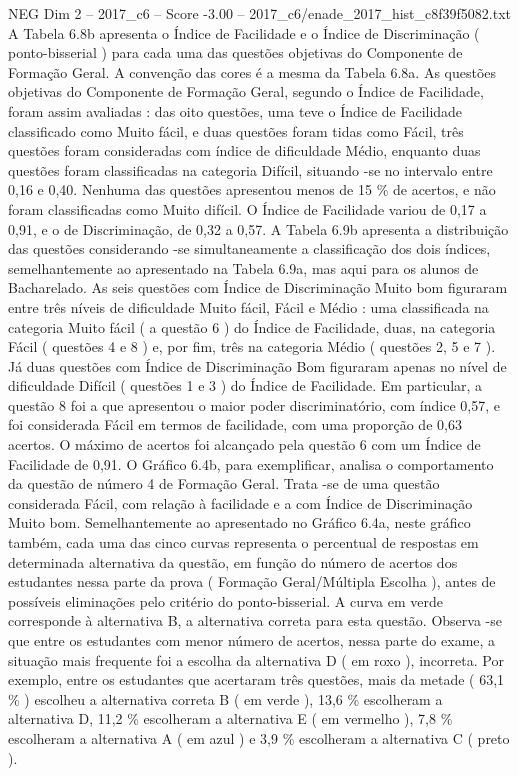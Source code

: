 \begin{textsample}{NEG Dim 2 – 2017\_c6 – Score -3.00 – 2017\_c6/enade\_2017\_hist\_c8f39f5082.txt}
A Tabela 6.8b apresenta o Índice de Facilidade e o Índice de Discriminação ( ponto-bisserial ) para cada uma das questões objetivas do Componente de Formação Geral.
A convenção das cores é a mesma da Tabela 6.8a.
As questões objetivas do Componente de Formação Geral, segundo o Índice de Facilidade, foram assim avaliadas : das oito questões, uma teve o Índice de Facilidade classificado como Muito fácil, e duas questões foram tidas como Fácil, três questões foram consideradas com índice de dificuldade Médio, enquanto duas questões foram classificadas na categoria Difícil, situando -se no intervalo entre 0,16 e 0,40.
Nenhuma das questões apresentou menos de 15 \% de acertos, e não foram classificadas como Muito difícil.
O Índice de Facilidade variou de 0,17 a 0,91, e o de Discriminação, de 0,32 a 0,57.
A Tabela 6.9b apresenta a distribuição das questões considerando -se simultaneamente a classificação dos dois índices, semelhantemente ao apresentado na Tabela 6.9a, mas aqui para os alunos de Bacharelado.
As seis questões com Índice de Discriminação Muito bom figuraram entre três níveis de dificuldade Muito fácil, Fácil e Médio : uma classificada na categoria Muito fácil ( a questão 6 ) do Índice de Facilidade, duas, na categoria Fácil ( questões 4 e 8 ) e, por fim, três na categoria Médio ( questões 2, 5 e 7 ).
Já duas questões com Índice de Discriminação Bom figuraram apenas no nível de dificuldade Difícil ( questões 1 e 3 ) do Índice de Facilidade.
Em particular, a questão 8 foi a que apresentou o maior poder discriminatório, com índice 0,57, e foi considerada Fácil em termos de facilidade, com uma proporção de 0,63 acertos.
O máximo de acertos foi alcançado pela questão 6 com um Índice de Facilidade de 0,91.
O Gráfico 6.4b, para exemplificar, analisa o comportamento da questão de número 4 de Formação Geral.
Trata -se de uma questão considerada Fácil, com relação à facilidade e a com Índice de Discriminação Muito bom.
Semelhantemente ao apresentado no Gráfico 6.4a, neste gráfico também, cada uma das cinco curvas representa o percentual de respostas em determinada alternativa da questão, em função do número de acertos dos estudantes nessa parte da prova ( Formação Geral/Múltipla Escolha ), antes de possíveis eliminações pelo critério do ponto-bisserial.
A curva em verde corresponde à alternativa B, a alternativa correta para esta questão.
Observa -se que entre os estudantes com menor número de acertos, nessa parte do exame, a situação mais frequente foi a escolha da alternativa D ( em roxo ), incorreta.
Por exemplo, entre os estudantes que acertaram três questões, mais da metade ( 63,1 \% ) escolheu a alternativa correta B ( em verde ), 13,6 \% escolheram a alternativa D, 11,2 \% escolheram a alternativa E ( em vermelho ), 7,8 \% escolheram a alternativa A ( em azul ) e 3,9 \% escolheram a alternativa C ( preto ).

\end{textsample}
